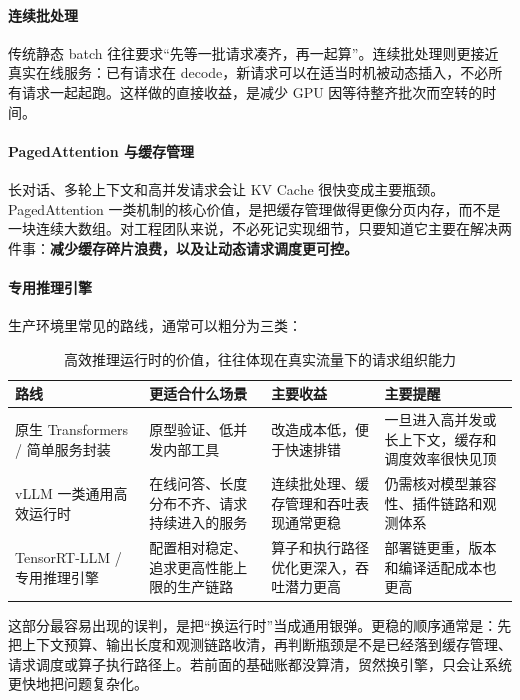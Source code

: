 \paragraph{连续批处理}
传统静态 batch 往往要求“先等一批请求凑齐，再一起算”。连续批处理则更接近真实在线服务：已有请求在 decode，新请求可以在适当时机被动态插入，不必所有请求一起起跑。这样做的直接收益，是减少 GPU 因等待整齐批次而空转的时间。

\paragraph{PagedAttention 与缓存管理}
长对话、多轮上下文和高并发请求会让 KV Cache 很快变成主要瓶颈。PagedAttention 一类机制的核心价值，是把缓存管理做得更像分页内存，而不是一块连续大数组。对工程团队来说，不必死记实现细节，只要知道它主要在解决两件事：\textbf{减少缓存碎片浪费，以及让动态请求调度更可控。}

\paragraph{专用推理引擎}
生产环境里常见的路线，通常可以粗分为三类：
\begin{table}[H]
\centering
\small
\begin{tabularx}{\textwidth}{>{\raggedright\arraybackslash}p{3cm}>{\raggedright\arraybackslash}p{3.1cm}>{\raggedright\arraybackslash}p{2.7cm}>{\raggedright\arraybackslash}X}
\toprule
\textbf{路线} & \textbf{更适合什么场景} & \textbf{主要收益} & \textbf{主要提醒} \\
\midrule
原生 Transformers / 简单服务封装 & 原型验证、低并发内部工具 & 改造成本低，便于快速排错 & 一旦进入高并发或长上下文，缓存和调度效率很快见顶 \\
vLLM 一类通用高效运行时 & 在线问答、长度分布不齐、请求持续进入的服务 & 连续批处理、缓存管理和吞吐表现通常更稳 & 仍需核对模型兼容性、插件链路和观测体系 \\
TensorRT-LLM / 专用推理引擎 & 配置相对稳定、追求更高性能上限的生产链路 & 算子和执行路径优化更深入，吞吐潜力更高 & 部署链更重，版本和编译适配成本也更高 \\
\bottomrule
\end{tabularx}
\caption{高效推理运行时的价值，往往体现在真实流量下的请求组织能力}
\label{tab:inference-runtime-choice}
\end{table}

这部分最容易出现的误判，是把“换运行时”当成通用银弹。更稳的顺序通常是：先把上下文预算、输出长度和观测链路收清，再判断瓶颈是不是已经落到缓存管理、请求调度或算子执行路径上。若前面的基础账都没算清，贸然换引擎，只会让系统更快地把问题复杂化。

